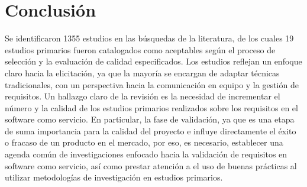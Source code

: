 \documentclass[conference,onecolumn,10pt]{IEEEtran}
\begin{document}
\section{Conclusión}
Se identificaron 1355 estudios en las búsquedas de la literatura, de los cuales 19 estudios primarios 
fueron catalogados como aceptables según el proceso de selección y la evaluación de calidad especificados. 
Los estudios reflejan un enfoque claro hacia la elicitación, ya que la mayoría se encargan de adaptar 
técnicas tradicionales, con un perspectiva hacia la comunicación en equipo y la gestión de requisitos.
Un hallazgo claro de la revisión es la necesidad de incrementar el número y la calidad de los estudios primarios 
realizados sobre los requisitos en el software como servicio. En particular, la fase de validación, ya que 
es una etapa de suma importancia para la calidad del proyecto e influye directamente el éxito o fracaso de un producto 
en el mercado, por eso, es necesario, establecer una agenda común de investigaciones enfocado hacia la validación de requisitos en software 
como servicio, así como prestar atención a el uso de buenas prácticas al utilizar metodologías de investigación en estudios 
primarios. 


\appendices
\end{document}
